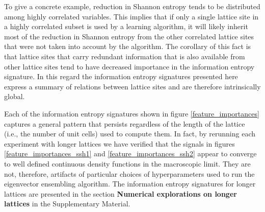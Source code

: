 \documentclass[10pt]{revtex4-1}
\begin{document}
To give a concrete example, reduction in Shannon entropy tends to be distributed among highly correlated variables. This implies that if only a single lattice site in a highly correlated subset is used by a learning algorithm, it will likely inherit most of the reduction in Shannon entropy from the other correlated lattice sites that were not taken into account by the algorithm. The corollary of this fact is that lattice sites that carry redundant information that is also available from other lattice sites tend to have decreased importance in the information entropy signature.  In this regard the information entropy signatures presented here express a summary of relations between lattice sites and are therefore intrinsically global.

Each of the information entropy signatures shown in figure \ref{feature_importances} captures a general pattern that persists regardless of the length of the lattice (i.e., the number of unit cells) used to compute them. In fact, by rerunning each experiment with longer lattices we have verified that the signals in figures \ref{feature_importances_ssh1} and \ref{feature_importances_ssh2} appear to converge to well defined continuous density functions in the macroscopic limit. They are not, therefore, artifacts of particular choices of hyperparameters used to run the eigenvector ensembling algorithm. The information entropy signatures for longer lattices are presented in the section \textbf{Numerical explorations on longer lattices} in the Supplementary Material.
\end{document}

